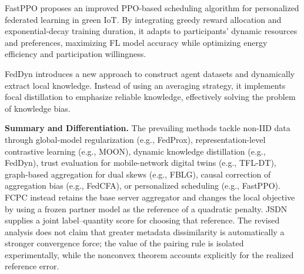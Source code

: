 \documentclass[journal,twoside,web]{ieeecolor}
\begin{document}
FastPPO\cite{fastppo} proposes an improved PPO-based scheduling algorithm for personalized federated learning in green IoT. By integrating greedy reward allocation and exponential-decay training duration, it adapts to participants’ dynamic resources and preferences, maximizing FL model accuracy while optimizing energy efficiency and participation willingness.

FedDyn\cite{feddyn} introduces a new approach to construct agent datasets and dynamically extract local knowledge. Instead of using an averaging strategy, it implements focal distillation to emphasize reliable knowledge, effectively solving the problem of knowledge bias.






\textbf{Summary and Differentiation. }The prevailing methods tackle non-IID data through global-model regularization (e.g., FedProx), representation-level contrastive learning (e.g., MOON), dynamic knowledge distillation (e.g., FedDyn), trust evaluation for mobile-network digital twins (e.g., TFL-DT\cite{tfl-dt}), graph-based aggregation for dual skews (e.g., FBLG\cite{fblg}), causal correction of aggregation bias (e.g., FedCFA\cite{fedcfa}), or personalized scheduling (e.g., FastPPO). FCPC instead retains the base server aggregator and changes the local objective by using a frozen partner model as the reference of a quadratic penalty. JSDN supplies a joint label--quantity score for choosing that reference. The revised analysis does not claim that greater metadata dissimilarity is automatically a stronger convergence force; the value of the pairing rule is isolated experimentally, while the nonconvex theorem accounts explicitly for the realized reference error.
\end{document}
